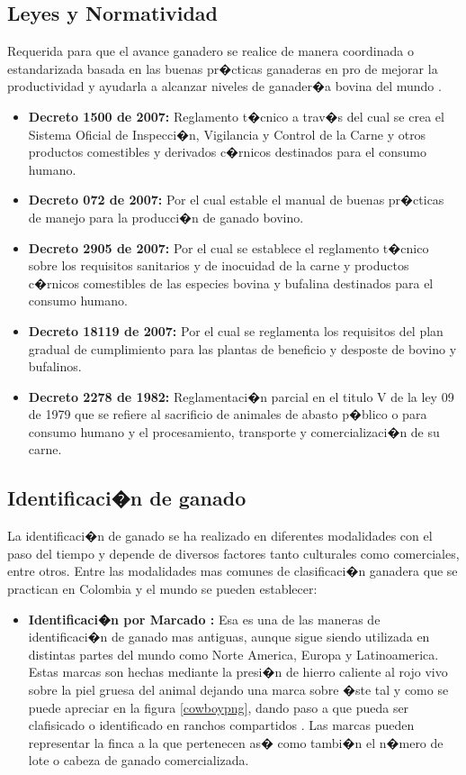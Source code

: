 \begin{itemize}
\subsection{Leyes y Normatividad}  \label{leyes}
Requerida para que el avance ganadero se realice de manera coordinada o estandarizada basada en las buenas pr�cticas ganaderas en pro de mejorar la productividad y ayudarla a alcanzar niveles de ganader�a bovina del mundo \cite{invima}. 
\begin{itemize}
	\item \textbf{Decreto 1500 de 2007:} Reglamento t�cnico a trav�s del cual se crea el Sistema Oficial de Inspecci�n, Vigilancia y Control de la Carne y otros productos comestibles y derivados c�rnicos destinados para el consumo humano.
	\item \textbf{Decreto 072 de 2007:} Por el cual estable el manual de buenas pr�cticas de manejo para la producci�n de ganado bovino.
	\item \textbf{Decreto 2905 de 2007:} Por el cual se establece el reglamento t�cnico sobre los requisitos sanitarios y de inocuidad de la carne y productos c�rnicos comestibles de las especies bovina y bufalina destinados para el consumo humano.
	\item \textbf{Decreto 18119 de 2007:} Por el cual se reglamenta los requisitos del plan gradual de cumplimiento para  las plantas de beneficio y desposte de bovino y bufalinos.
	\item \textbf{Decreto 2278 de 1982:} Reglamentaci�n parcial en el titulo V de la ley 09 de 1979 que se refiere al sacrificio de animales de abasto p�blico o para consumo humano y el procesamiento, transporte y comercializaci�n de su carne.
\end{itemize}

\subsection{Identificaci�n de ganado}
	
	La identificaci�n de ganado se ha realizado en diferentes modalidades con el paso del tiempo y depende de diversos factores tanto culturales como comerciales, entre otros. Entre las modalidades mas comunes de clasificaci�n ganadera que se practican en Colombia y el mundo se pueden establecer:
	\begin{itemize}
	
		\item \textbf{Identificaci�n por Marcado :} Esa es una de las maneras de identificaci�n de ganado mas antiguas, aunque sigue siendo utilizada en distintas partes del mundo como Norte America, Europa y Latinoamerica. Estas marcas son hechas mediante la presi�n de hierro caliente al rojo vivo sobre la piel gruesa del animal dejando una marca sobre �ste tal y como se puede apreciar en la  figura \ref{cowboypng}, dando paso a que pueda ser clafisicado o identificado en ranchos compartidos \cite{cowboy}. Las marcas pueden representar la finca a la que pertenecen as� como tambi�n el n�mero de lote o cabeza de ganado comercializada.
		

\end{itemize}
\end{itemize}
